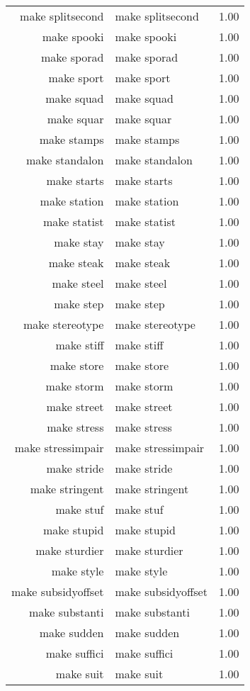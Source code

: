 \begin{table}[ht]
\begin{tabular}{rlr}
  make splitsecond & make splitsecond & 1.00 \\ 
  make spooki & make spooki & 1.00 \\ 
  make sporad & make sporad & 1.00 \\ 
  make sport & make sport & 1.00 \\ 
  make squad & make squad & 1.00 \\ 
  make squar & make squar & 1.00 \\ 
  make stamps & make stamps & 1.00 \\ 
  make standalon & make standalon & 1.00 \\ 
  make starts & make starts & 1.00 \\ 
  make station & make station & 1.00 \\ 
  make statist & make statist & 1.00 \\ 
  make stay & make stay & 1.00 \\ 
  make steak & make steak & 1.00 \\ 
  make steel & make steel & 1.00 \\ 
  make step & make step & 1.00 \\ 
  make stereotype & make stereotype & 1.00 \\ 
  make stiff & make stiff & 1.00 \\ 
  make store & make store & 1.00 \\ 
  make storm & make storm & 1.00 \\ 
  make street & make street & 1.00 \\ 
  make stress & make stress & 1.00 \\ 
  make stressimpair & make stressimpair & 1.00 \\ 
  make stride & make stride & 1.00 \\ 
  make stringent & make stringent & 1.00 \\ 
  make stuf & make stuf & 1.00 \\ 
  make stupid & make stupid & 1.00 \\ 
  make sturdier & make sturdier & 1.00 \\ 
  make style & make style & 1.00 \\ 
  make subsidyoffset & make subsidyoffset & 1.00 \\ 
  make substanti & make substanti & 1.00 \\ 
  make sudden & make sudden & 1.00 \\ 
  make suffici & make suffici & 1.00 \\ 
  make suit & make suit & 1.00 \\ 

\end{tabular}
\end{table}
